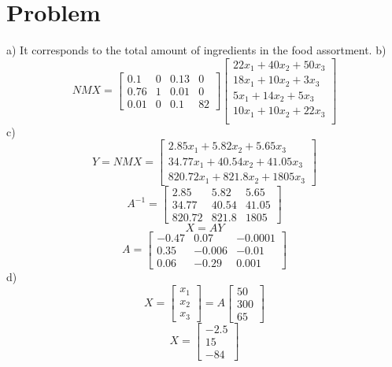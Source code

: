 \documentclass[11pt]{article}
\begin{document}
    \section{Problem}
    a) It corresponds to the total amount of ingredients in the food assortment. \newline
    b)
    \[ NMX = \begin{bmatrix}
                 0.1  & 0 & 0.13 & 0\\
                 0.76 & 1 & 0.01 & 0\\
                 0.01 & 0 & 0.1  & 82
    \end{bmatrix}  \begin{bmatrix}
                                    22x_1 + 40x_2 + 50x_3\\
                                    18x_1 + 10x_2 + 3 x_3\\
                                    5 x_1 + 14x_2 + 5 x_3\\
                                    10x_1 + 10x_2 + 22x_3\\
    \end{bmatrix} \]
    c)
    \[ Y=NMX= \begin{bmatrix}
                     2.85x_1   + 5.82x_2  + 5.65x_3\\
                     34.77x_1  + 40.54x_2 + 41.05x_3\\
                     820.72x_1 + 821.8x_2 + 1805x_3
    \end{bmatrix}  \]
    \[ A^{-1} = \begin{bmatrix}
               2.85   & 5.82  & 5.65\\
               34.77  & 40.54 & 41.05\\
               820.72 & 821.8 & 1805
    \end{bmatrix} \]
    \[ X=AY\]
    \[ A = \begin{bmatrix}
               -0.47 &  0.07  & -0.0001\\
               0.35  & -0.006 & -0.01\\
               0.06  & -0.29  &  0.001
    \end{bmatrix}\]
    d)
    \[ X = \begin{bmatrix}
        x_1\\
        x_2\\
        x_3
    \end{bmatrix} = A \begin{bmatrix}
                                 50\\
                                 300\\
                                 65
    \end{bmatrix} \]
    \[ X = \begin{bmatrix}
               -2.5\\
               15\\
               -84
    \end{bmatrix}\]
\end{document}
